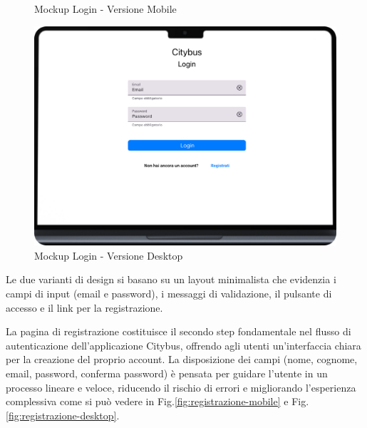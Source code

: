 \begin{figure}[H]
\begin{minipage}[b]{0.25\textwidth}
    \caption{Mockup Login - Versione Mobile}
    \label{fig:login-mobile}
  \end{minipage}
  \hfill
  \begin{minipage}[b]{0.68\textwidth}
    \centering
    \includegraphics[width=\textwidth]{images/mockup/Login Desktop.png}
    \caption{Mockup Login - Versione Desktop}
    \label{fig:login-desktop}
  \end{minipage}
\end{figure}

Le due varianti di design si basano su un layout minimalista che evidenzia i campi di input (email e password), i messaggi di validazione, il pulsante di accesso e il link per la registrazione.

La pagina di registrazione costituisce il secondo step fondamentale nel flusso di autenticazione dell’applicazione Citybus, offrendo agli utenti un’interfaccia chiara per la creazione del proprio account. La disposizione dei campi (nome, cognome, email, password, conferma password) è pensata per guidare l’utente in un processo lineare e veloce, riducendo il rischio di errori e migliorando l’esperienza complessiva come si può vedere in Fig.\ref{fig:registrazione-mobile} e Fig.\ref{fig:registrazione-desktop}.

